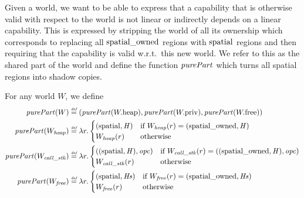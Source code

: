 \begin{jversion}
Given a world, we want to be able to express that a capability that is otherwise valid with respect to the world is not linear or indirectly depends on a linear capability.
This is expressed by stripping the world of all its ownership which corresponds to replacing all $\mathrm{spatial\_owned}$ regions with $\mathrm{spatial}$ regions and then requiring that the capability is valid w.r.t.\ this new world.
We refer to this as the shared part of the world and define the function $\purePart{}$ which turns all spatial regions into shadow copies.
\begin{definition}
  \label{def:purePart}
  For any world $W$, we define
  \begin{align*}
    \purePart{W} &\defeq (\purePart{\pwheap},\purePart{\pwpriv},\purePart{\pwfree})\\
    \purePart{W_\var{heap}} &\defeq \lambda r\ldotp
                       \begin{cases}
                         (\spatial,\var{H}) & \text{if } W_\var{heap}(r) = (\spatialo,\var{H})\\
                         W_{\var{heap}}(r) & \text{otherwise}
                       \end{cases}\\
    \purePart{W_\var{call\_stk}} &\defeq \lambda r\ldotp
                       \begin{cases}
                         ((\spatial,\var{H}),\opc) & \text{if } W_\var{call\_stk}(r) = ((\spatialo,\var{H}),\opc)\\
                         W_\var{call\_stk}(r) & \text{otherwise}
                       \end{cases}\\
    \purePart{W_\var{free}} &\defeq \lambda r\ldotp
                       \begin{cases}
                         (\spatial,\var{Hs}) & \text{if } W_{\var{free}}(r) = (\spatialo,\var{Hs})\\
                         W_{\var{free}}(r) & \text{otherwise}
                       \end{cases}
  \end{align*}
\end{definition}


\end{jversion}
